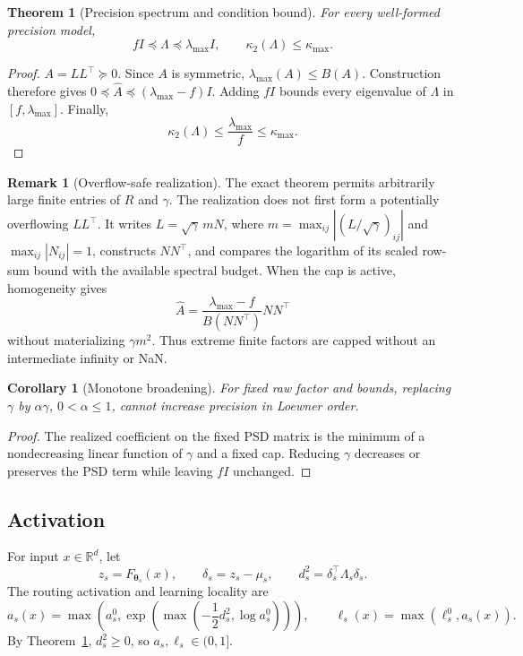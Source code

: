 \documentclass[11pt]{article}
\theoremstyle{definition}
\newtheorem{remark}[definition]{Remark}
\theoremstyle{plain}
\newtheorem{theorem}[definition]{Theorem}
\newtheorem{corollary}[definition]{Corollary}
\newcommand{\R}{\mathbb{R}}
\begin{document}
\begin{theorem}[Precision spectrum and condition bound]
\label{thm:precision}
For every well-formed precision model,
\[
 fI\preceq\Lambda\preceq\lambda_{\max}I,
 \qquad
 \kappa_2(\Lambda)\le\kappa_{\max}.
\]
\end{theorem}

\begin{proof}
$A=LL^\top\succeq0$.  Since $A$ is symmetric,
$\lambda_{\max}(A)\le B(A)$.  Construction therefore gives
$0\preceq\widehat A\preceq(\lambda_{\max}-f)I$.  Adding $fI$ bounds every
eigenvalue of $\Lambda$ in $[f,\lambda_{\max}]$.  Finally,
\[
\kappa_2(\Lambda)
\le\frac{\lambda_{\max}}{f}
\le\kappa_{\max}.
\]
\end{proof}

\begin{remark}[Overflow-safe realization]
The exact theorem permits arbitrarily large finite entries of $R$ and
$\gamma$.  The realization does not first form a potentially overflowing
$LL^\top$.  It writes $L=\sqrt{\gamma}\,mN$, where
$m=\max_{ij}|(L/\sqrt{\gamma})_{ij}|$ and $\max_{ij}|N_{ij}|=1$, constructs
$NN^\top$, and compares the logarithm of its scaled row-sum bound with the
available spectral budget.  When the cap is active, homogeneity gives
\[
 \widehat A=\frac{\lambda_{\max}-f}{B(NN^\top)}NN^\top
\]
without materializing $\gamma m^2$.  Thus extreme finite factors are capped
without an intermediate infinity or NaN.
\end{remark}

\begin{corollary}[Monotone broadening]
\label{cor:broadening}
For fixed raw factor and bounds, replacing $\gamma$ by
$\alpha\gamma$, $0<\alpha\le1$, cannot increase precision in Loewner order.
\end{corollary}

\begin{proof}
The realized coefficient on the fixed PSD matrix is the minimum of a
nondecreasing linear function of $\gamma$ and a fixed cap.  Reducing
$\gamma$ decreases or preserves the PSD term while leaving $fI$ unchanged.
\end{proof}

\subsection{Activation}

For input $x\in\R^d$, let
\[
z_s=F_{\boldsymbol\theta_s}(x),\qquad
\delta_s=z_s-\mu_s,\qquad
d_s^2=\delta_s^\top\Lambda_s\delta_s.
\]
The routing activation and learning locality are
\[
a_s(x)=\max\left(a_s^0,
\exp\left(\max\left(-\frac12d_s^2,\log a_s^0\right)\right)\right),
\qquad
\ell_s(x)=\max(\ell_s^0,a_s(x)).
\]
By Theorem~\ref{thm:precision}, $d_s^2\ge0$, so
$a_s,\ell_s\in(0,1]$.
\end{document}
